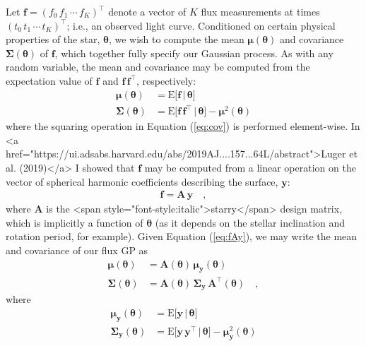 Let
$\mathbf{f} = \left( f_0 \, f_1 \, \cdots \,  f_K \right)^\top$
denote a vector of $K$ flux measurements at times
$\left( t_0 \,  t_1 \,  \cdots \, t_K \right)^\top$; i.e., an observed
light curve.
Conditioned on certain physical properties of the star, $\pmb{\theta}$,
we wish to compute the mean $\pmb{\mu}(\pmb{\theta})$ and
covariance $\pmb{\Sigma}(\pmb{\theta})$
of $\mathbf{f}$, which together fully specify our Gaussian process.
As with any random variable, the mean and covariance may be computed from
the expectation value of $\mathbf{f}$ and
$\mathbf{f}\,\mathbf{f}^\top$, respectively:
\begin{align}
    \label{eq:mean}
    \pmb{\mu}(\pmb{\theta})
     & = \mathrm{E} \Big[ \mathbf{f} \, \Big| \, \pmb{\theta} \Big]
    \\
    \label{eq:cov}
    \pmb{\Sigma}(\pmb{\theta})
     & = \mathrm{E} \Big[ \mathbf{f} \, \mathbf{f}^\top \, \Big| \, \pmb{\theta} \Big] - \pmb{\mu}^2(\pmb{\theta})
\end{align}
where the squaring operation in Equation (\ref{eq:cov}) is
performed element-wise.
In <a href="https://ui.adsabs.harvard.edu/abs/2019AJ....157...64L/abstract">Luger et al. (2019)</a> I showed that $\mathbf{f}$ may be computed from a
linear operation on the vector of spherical harmonic coefficients
describing the surface, $\mathbf{y}$:
\begin{align}
    \label{eq:fAy}
    \mathbf{f} = \mathbf{A} \, \mathbf{y}
    \quad,
\end{align}
where $\mathbf{A}$ is the <span style="font-style:italic">starry</span> design matrix, which is implicitly
a function of $\pmb{\theta}$ (as it depends on the stellar inclination
and rotation period, for example).
Given Equation (\ref{eq:fAy}),
we may write the mean and covariance of our flux GP as
\begin{align}
    \pmb{\mu}(\pmb{\theta})
     & = \mathbf{A}(\pmb{\theta}) \, \pmb{\mu}_{\mathbf{y}}(\pmb{\theta})
    \\
    \pmb{\Sigma}(\pmb{\theta})
     & = \mathbf{A}(\pmb{\theta}) \, \pmb{\Sigma}_{\mathbf{y}} \, \mathbf{A}^\top(\pmb{\theta})
    \quad,
\end{align}
where
\begin{align}
    \label{eq:mean_y}
    \pmb{\mu}_{\mathbf{y}}(\pmb{\theta})
     & = \mathrm{E} \Big[ \mathbf{y} \, \Big| \, \pmb{\theta} \Big]
    \\
    \label{eq:cov_y}
    \pmb{\Sigma}_{\mathbf{y}}(\pmb{\theta})
     & = \mathrm{E} \Big[ \mathbf{y} \, \mathbf{y}^\top \, \Big| \, \pmb{\theta} \Big] - \pmb{\mu}_{\mathbf{y}}^2(\pmb{\theta})
\end{align}
